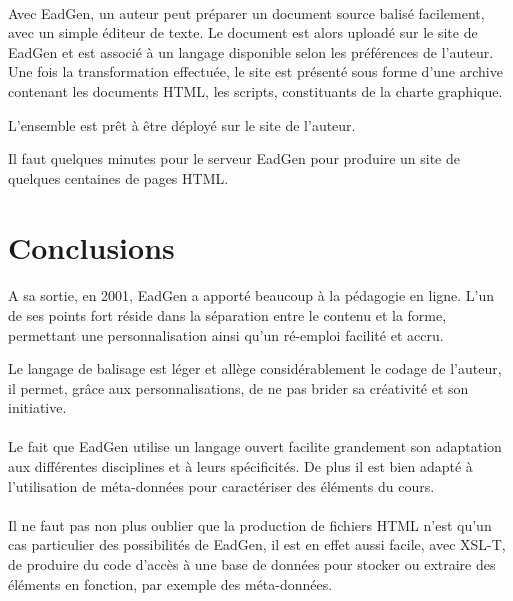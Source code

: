 \paragraph{}Avec EadGen, un auteur peut préparer un document source balisé facilement, avec un simple éditeur de texte. Le document est alors uploadé sur le site de EadGen et est associé à un langage disponible selon les préférences de l'auteur. Une fois la transformation effectuée, le site est présenté sous forme d'une archive contenant les documents HTML, les scripts, constituants de la charte graphique.

L'ensemble est prêt à être déployé sur le site de l'auteur.

Il faut quelques minutes pour le serveur EadGen pour produire un site de quelques centaines de pages HTML.





\section{Conclusions}


\paragraph{}A sa sortie, en 2001, EadGen a apporté beaucoup à la pédagogie en ligne. L'un de ses points fort réside dans la séparation entre le contenu et la forme, permettant une personnalisation ainsi qu'un ré-emploi facilité et accru.


Le langage de balisage est léger et allège considérablement le codage de l'auteur, il permet, grâce aux personnalisations, de ne pas brider sa créativité et son initiative.


\paragraph{}Le fait que EadGen utilise un langage ouvert facilite grandement son adaptation aux différentes disciplines et à leurs spécificités. De plus il est bien adapté à l'utilisation de méta-données pour caractériser des éléments du cours.


\paragraph{}Il ne faut pas non plus oublier que la production de fichiers HTML n'est qu'un cas particulier des possibilités de EadGen, il est en effet aussi facile, avec XSL-T, de produire du code d'accès à une base de données pour stocker ou extraire des éléments en fonction, par exemple des méta-données.
